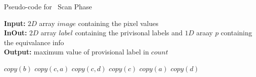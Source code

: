 \clearpage
\begin{algorithm}[H]
\small
{
	\caption{Pseudo-code for \nremsp\ Scan Phase}
	\label{alg:RemSP-I}
	\textbf{Input:} $2D$ array $image$ containing the pixel values \\
	\textbf{InOut:} $2D$ array $label$ containing the privisonal labels and $1D$ araay $p$ containing the equivalance info\\
	\textbf{Output:} maximum value of provisional label in $count$
	\begin{algorithmic}[1]
						\State $copy(b)$
					\Else
								\State $copy(c,a)$
							\Else
									\State $copy(c,d)$
								\Else
									\State $copy(c)$
								\EndIf
							\EndIf
						\Else
								\State $copy(a)$
							\Else
									\State $copy(d)$
								\Else
								\EndIf
							\EndIf
						\EndIf
					\EndIf
				\EndIf
			\EndFor
		\EndFor
		\State {}
	\EndFunction
	\end{algorithmic}
}	
\end{algorithm}

